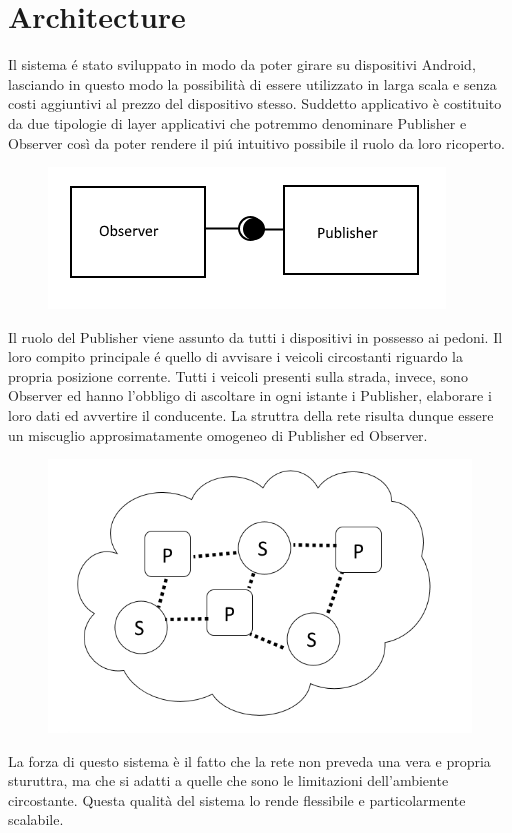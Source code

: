 \documentclass[conference]{IEEEtran}
\begin{document}
\section{Architecture}
Il sistema \'e stato sviluppato in modo da poter girare su dispositivi Android, lasciando in questo modo la possibilità di essere utilizzato in larga scala e senza costi aggiuntivi al prezzo del dispositivo stesso.
Suddetto applicativo è costituito da due tipologie di layer applicativi che potremmo denominare Publisher e Observer così da poter rendere il pi\'u intuitivo possibile il ruolo da loro ricoperto.
\begin{figure}[h!]
	\centering
	\includegraphics[width=0.7\linewidth]{ps}
	\caption[Concetti base]{}
	\caption{}
	\label{fig:ps}
\end{figure}
Il ruolo del Publisher viene assunto da tutti i dispositivi in possesso ai pedoni. Il loro compito principale \'e quello di avvisare i veicoli circostanti riguardo la propria posizione corrente.
Tutti i veicoli presenti sulla strada, invece, sono Observer ed hanno l'obbligo di ascoltare in ogni istante i Publisher, elaborare i loro dati ed avvertire il conducente.
La struttra della rete risulta dunque essere un miscuglio approsimatamente omogeneo di Publisher ed Observer.
\begin{figure}[h!]
	\centering
	\includegraphics[width=0.7\linewidth]{net}
	\caption[Rete]{}
	\caption{}
	\label{fig:net}
\end{figure}
La forza di questo sistema è il fatto che la rete non preveda una vera e propria sturuttra, ma che si adatti a quelle che sono le limitazioni dell'ambiente circostante.
Questa qualità del sistema lo rende flessibile e particolarmente scalabile.
\end{document}
